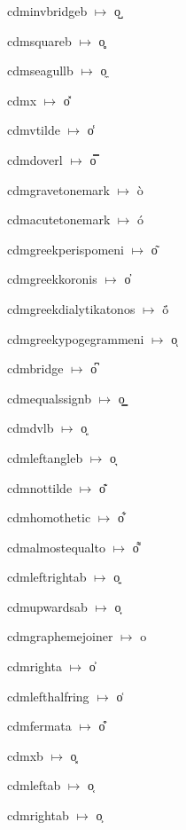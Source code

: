{\noindent cdminvbridgeb $\mapsto$ {\cdmformat o̺}\par
\noindent cdmsquareb $\mapsto$ {\cdmformat o̻}\par
\noindent cdmseagullb $\mapsto$ {\cdmformat o̼}\par
\noindent cdmx $\mapsto$ {\cdmformat o̽}\par
\noindent cdmvtilde $\mapsto$ {\cdmformat o̾}\par
\noindent cdmdoverl $\mapsto$ {\cdmformat o̿}\par
\noindent cdmgravetonemark $\mapsto$ {\cdmformat ò}\par
\noindent cdmacutetonemark $\mapsto$ {\cdmformat ó}\par
\noindent cdmgreekperispomeni $\mapsto$ {\cdmformat o͂}\par
\noindent cdmgreekkoronis $\mapsto$ {\cdmformat o̓}\par
\noindent cdmgreekdialytikatonos $\mapsto$ {\cdmformat ö́}\par
\noindent cdmgreekypogegrammeni $\mapsto$ {\cdmformat oͅ}\par
\noindent cdmbridge $\mapsto$ {\cdmformat o͆}\par
\noindent cdmequalssignb $\mapsto$ {\cdmformat o͇}\par
\noindent cdmdvlb $\mapsto$ {\cdmformat o͈}\par
\noindent cdmleftangleb $\mapsto$ {\cdmformat o͉}\par
\noindent cdmnottilde $\mapsto$ {\cdmformat o͊}\par
\noindent cdmhomothetic $\mapsto$ {\cdmformat o͋}\par
\noindent cdmalmostequalto $\mapsto$ {\cdmformat o͌}\par
\noindent cdmleftrightab $\mapsto$ {\cdmformat o͍}\par
\noindent cdmupwardsab $\mapsto$ {\cdmformat o͎}\par
\noindent cdmgraphemejoiner $\mapsto$ {\cdmformat o͏}\par
\noindent cdmrighta $\mapsto$ {\cdmformat o͐}\par
\noindent cdmlefthalfring $\mapsto$ {\cdmformat o͑}\par
\noindent cdmfermata $\mapsto$ {\cdmformat o͒}\par
\noindent cdmxb $\mapsto$ {\cdmformat o͓}\par
\noindent cdmleftab $\mapsto$ {\cdmformat o͔}\par
\noindent cdmrightab $\mapsto$ {\cdmformat o͕}\par
}
